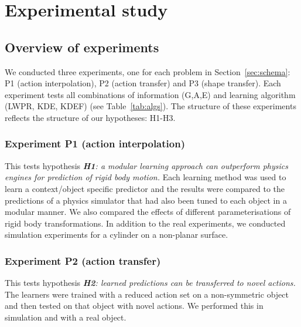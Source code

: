 
\newlength{\barchartwidth}
\setlength{\barchartwidth}{6.5cm}

\section{Experimental study}\label{sec:Experiment}

\subsection{Overview of experiments}\label{sec:Experiment.Overview}

We conducted three experiments, one for each problem in Section~\ref{sec:schema}: P1 (action interpolation), P2 (action transfer) and P3
(shape transfer). Each experiment tests all combinations of information (G,A,E) and learning algorithm (LWPR, KDE, KDEF) (see Table~\ref{tab:algs}). The structure of these experiments reflects the structure of our hypotheses: H1-H3.

\subsubsection{Experiment P1 (action interpolation)} This tests hypothesis {\em {\bf H1}: a modular learning approach can outperform physics engines for prediction of rigid body motion.} Each learning method was used to learn a context/object specific predictor and the results were compared to the predictions of a physics simulator that had also been tuned to each object in a modular manner. We also compared the effects of different parameterisations of rigid body transformations. In addition to the real experiments, we conducted simulation experiments for a cylinder on a non-planar surface.

\subsubsection{Experiment P2 (action transfer)} This tests hypothesis {\em {\bf H2}: learned predictions can be transferred to novel actions.} The learners were trained with a reduced action set on a non-symmetric object and then tested on that object with novel actions. We performed this in simulation and with a real object.

